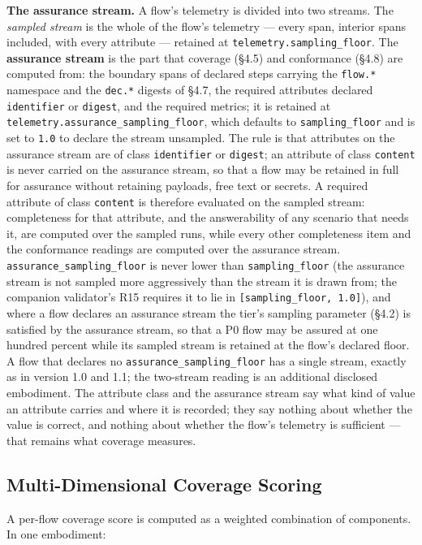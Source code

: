 \documentclass[11pt]{article}
\newcommand{\code}[1]{\texttt{#1}}
\begin{document}
\textbf{The assurance stream.} A flow's telemetry is divided into two streams. The \emph{sampled stream} is the whole of the flow's telemetry --- every span, interior spans included, with every attribute --- retained at \code{telemetry.sampling\_floor}. The \textbf{assurance stream} is the part that coverage (\S4.5) and conformance (\S4.8) are computed from: the boundary spans of declared steps carrying the \code{flow.*} namespace and the \code{dec.*} digests of \S4.7, the required attributes declared \code{identifier} or \code{digest}, and the required metrics; it is retained at \code{telemetry.assurance\_sampling\_floor}, which defaults to \code{sampling\_floor} and is set to \code{1.0} to declare the stream unsampled. The rule is that attributes on the assurance stream are of class \code{identifier} or \code{digest}; an attribute of class \code{content} is never carried on the assurance stream, so that a flow may be retained in full for assurance without retaining payloads, free text or secrets. A required attribute of class \code{content} is therefore evaluated on the sampled stream: completeness for that attribute, and the answerability of any scenario that needs it, are computed over the sampled runs, while every other completeness item and the conformance readings are computed over the assurance stream. \code{assurance\_sampling\_floor} is never lower than \code{sampling\_floor} (the assurance stream is not sampled more aggressively than the stream it is drawn from; the companion validator's R15 requires it to lie in \code{[sampling\_floor, 1.0]}), and where a flow declares an assurance stream the tier's sampling parameter (\S4.2) is satisfied by the assurance stream, so that a P0 flow may be assured at one hundred percent while its sampled stream is retained at the flow's declared floor. A flow that declares no \code{assurance\_sampling\_floor} has a single stream, exactly as in version 1.0 and 1.1; the two-stream reading is an additional disclosed embodiment. The attribute class and the assurance stream say what kind of value an attribute carries and where it is recorded; they say nothing about whether the value is correct, and nothing about whether the flow's telemetry is sufficient --- that remains what coverage measures.

\subsection{Multi-Dimensional Coverage Scoring}
A per-flow coverage score is computed as a weighted combination of components. In one embodiment:
\end{document}
